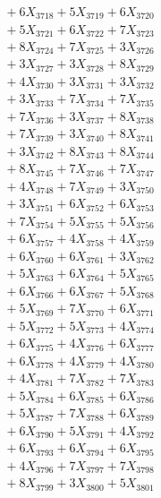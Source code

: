 \documentclass[a4paper,10pt]{article}
\begin{document}
{\begin{align}
&\;  + 6 X_{3718} + 5 X_{3719} + 6 X_{3720} \\[0.3ex]
&\;  + 5 X_{3721} + 6 X_{3722} + 7 X_{3723} \\[0.3ex]
&\;  + 8 X_{3724} + 7 X_{3725} + 3 X_{3726} \\[0.3ex]
&\;  + 3 X_{3727} + 3 X_{3728} + 8 X_{3729} \\[0.5ex]\allowbreak
&\;  + 4 X_{3730} + 3 X_{3731} + 3 X_{3732} \\[0.3ex]
&\;  + 3 X_{3733} + 7 X_{3734} + 7 X_{3735} \\[0.3ex]
&\;  + 7 X_{3736} + 3 X_{3737} + 8 X_{3738} \\[0.3ex]
&\;  + 7 X_{3739} + 3 X_{3740} + 8 X_{3741} \\[0.3ex]
&\;  + 3 X_{3742} + 8 X_{3743} + 8 X_{3744} \\[0.3ex]
&\;  + 8 X_{3745} + 7 X_{3746} + 7 X_{3747} \\[0.3ex]
&\;  + 4 X_{3748} + 7 X_{3749} + 3 X_{3750} \\[0.3ex]
&\;  + 3 X_{3751} + 6 X_{3752} + 6 X_{3753} \\[0.3ex]
&\;  + 7 X_{3754} + 5 X_{3755} + 5 X_{3756} \\[0.3ex]
&\;  + 6 X_{3757} + 4 X_{3758} + 4 X_{3759} \\[0.5ex]\allowbreak
&\;  + 6 X_{3760} + 6 X_{3761} + 3 X_{3762} \\[0.3ex]
&\;  + 5 X_{3763} + 6 X_{3764} + 5 X_{3765} \\[0.3ex]
&\;  + 6 X_{3766} + 6 X_{3767} + 5 X_{3768} \\[0.3ex]
&\;  + 5 X_{3769} + 7 X_{3770} + 6 X_{3771} \\[0.3ex]
&\;  + 5 X_{3772} + 5 X_{3773} + 4 X_{3774} \\[0.3ex]
&\;  + 6 X_{3775} + 4 X_{3776} + 6 X_{3777} \\[0.3ex]
&\;  + 6 X_{3778} + 4 X_{3779} + 4 X_{3780} \\[0.3ex]
&\;  + 4 X_{3781} + 7 X_{3782} + 7 X_{3783} \\[0.3ex]
&\;  + 5 X_{3784} + 6 X_{3785} + 6 X_{3786} \\[0.3ex]
&\;  + 5 X_{3787} + 7 X_{3788} + 6 X_{3789} \\[0.5ex]\allowbreak
&\;  + 6 X_{3790} + 5 X_{3791} + 4 X_{3792} \\[0.3ex]
&\;  + 6 X_{3793} + 6 X_{3794} + 6 X_{3795} \\[0.3ex]
&\;  + 4 X_{3796} + 7 X_{3797} + 7 X_{3798} \\[0.3ex]
&\;  + 8 X_{3799} + 3 X_{3800} + 5 X_{3801} \\[0.3ex]

\end{align}}
\end{document}
